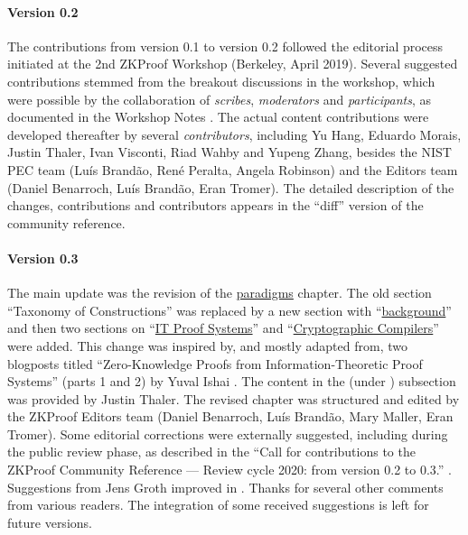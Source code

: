 \paragraph{Version 0.2}
The contributions from version 0.1 to version 0.2 followed the editorial process initiated at the 2nd ZKProof Workshop (Berkeley, April 2019).
Several suggested contributions stemmed from the breakout discussions in the workshop, which were possible by the collaboration of \emph{scribes}, \emph{moderators} and \emph{participants}, as documented in the Workshop Notes \cite{2019:zkproof:notes-2nd-workshop}.
The actual content contributions were developed thereafter by several \emph{contributors}, including Yu Hang, Eduardo Morais, Justin Thaler, Ivan Visconti, Riad Wahby and Yupeng Zhang, besides the NIST PEC team (Luís Brandão, René Peralta, Angela Robinson) and the Editors team (Daniel Benarroch, Luís Brandão, Eran Tromer).
The detailed description of the changes, contributions and contributors appears in the ``diff'' version of the community reference.


\paragraph{Version 0.3}
The main update was the revision of the \hyperref[chap:paradigms]{paradigms} chapter.
The old section ``Taxonomy of Constructions'' was replaced by a new section with  ``\hyperref[paradigms:background]{background}'' and then two sections on ``\hyperref[paradigms:IT]{IT Proof Systems}'' and ``\hyperref[paradigms:CC]{Cryptographic Compilers}'' were added.
This change was inspired by, and mostly adapted from, two blogposts titled ``Zero-Knowledge Proofs from Information-Theoretic Proof Systems'' (parts 1 and 2) by Yuval Ishai \cite{2020:Ish:zkproof-blog:ZKPs-from-IT-proof-systems}.
The content in the  (under ) subsection was provided by Justin Thaler.
The revised chapter was structured and edited by the ZKProof Editors team (Daniel Benarroch, Luís Brandão, Mary Maller, Eran Tromer). 
Some editorial corrections were externally suggested, including during the public review phase, as described in the ``Call for contributions to the ZKProof Community Reference --- Review cycle 2020: from version 0.2 to 0.3.'' \cite{2020:zkproof:call-contribs}.
Suggestions from Jens Groth improved  in . 
Thanks for several other comments from various readers.
The integration of some received suggestions is left for future versions.


